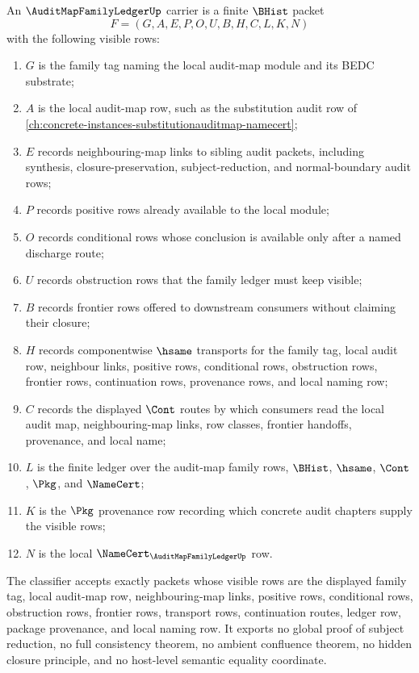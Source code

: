 \begin{definition}
\label{def:audit-map-family-ledger-carrier}
An $\AuditMapFamilyLedgerUp$ carrier is a finite $\BHist$ packet
$$
F=(G,A,E,P,O,U,B,H,C,L,K,N)
$$
with the following visible rows:
\begin{enumerate}
\item $G$ is the family tag naming the local audit-map module and its BEDC substrate;
\item $A$ is the local audit-map row, such as the substitution audit row of \autoref{ch:concrete-instances-substitutionauditmap-namecert};
\item $E$ records neighbouring-map links to sibling audit packets, including synthesis, closure-preservation, subject-reduction, and normal-boundary audit rows;
\item $P$ records positive rows already available to the local module;
\item $O$ records conditional rows whose conclusion is available only after a named discharge route;
\item $U$ records obstruction rows that the family ledger must keep visible;
\item $B$ records frontier rows offered to downstream consumers without claiming their closure;
\item $H$ records componentwise $\hsame$ transports for the family tag, local audit row, neighbour links, positive rows, conditional rows, obstruction rows, frontier rows, continuation rows, provenance rows, and local naming row;
\item $C$ records the displayed $\Cont$ routes by which consumers read the local audit map, neighbouring-map links, row classes, frontier handoffs, provenance, and local name;
\item $L$ is the finite ledger over the audit-map family rows, $\BHist$, $\hsame$, $\Cont$, $\Pkg$, and $\NameCert$;
\item $K$ is the $\Pkg$ provenance row recording which concrete audit chapters supply the visible rows;
\item $N$ is the local $\NameCert_{\AuditMapFamilyLedgerUp}$ row.
\end{enumerate}
The classifier accepts exactly packets whose visible rows are the displayed family tag, local audit-map row, neighbouring-map links, positive rows, conditional rows, obstruction rows, frontier rows, transport rows, continuation routes, ledger row, package provenance, and local naming row. It exports no global proof of subject reduction, no full consistency theorem, no ambient confluence theorem, no hidden closure principle, and no host-level semantic equality coordinate.
\end{definition}

